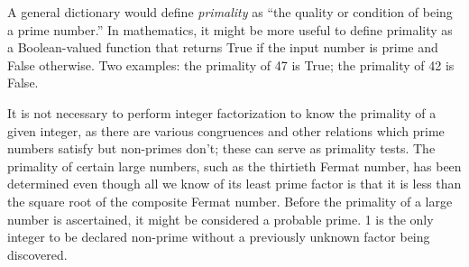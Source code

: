 \documentclass[12pt]{article}
\begin{document}
A general dictionary would define {\em primality} as ``the quality or condition of being a prime number.'' In mathematics, it might be more useful to define primality as a Boolean-valued function that returns True if the input number is prime and False otherwise. Two examples: the primality of 47 is True; the primality of 42 is False.

It is not necessary to perform integer factorization to know the primality of a given integer, as there are various congruences and other relations which prime numbers satisfy but non-primes don't; these can serve as primality tests. The primality of certain large numbers, such as the thirtieth Fermat number, has been determined even though all we know of its least prime factor is that it is less than the square root of the composite Fermat number. Before the primality of a large number is ascertained, it might be considered a probable prime. 1 is the only integer to be declared non-prime without a previously unknown factor being discovered.
\end{document}
